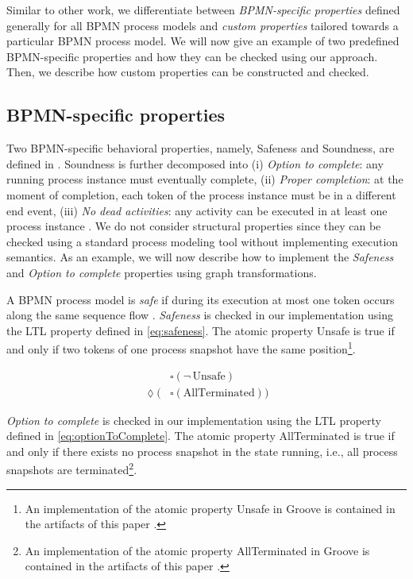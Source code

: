 \documentclass[adraft, copyright, creativecommons]{eptcs} %
\begin{document}
Similar to other work, we differentiate between \emph{BPMN-specific properties} defined generally for all BPMN process models and \emph{custom properties} tailored towards a particular BPMN process model.
We will now give an example of two predefined BPMN-specific properties and how they can be checked using our approach.
Then, we describe how custom properties can be constructed and checked.

\subsection{BPMN-specific properties}
Two BPMN-specific behavioral properties, namely, Safeness and Soundness, are defined in \cite{corradiniClassificationBPMNCollaborations2018}.
Soundness is further decomposed into (i) \emph{Option to complete}: any running process instance must eventually complete, (ii) \emph{Proper completion}: at the moment of completion, each token of the process instance must be in a different end event, (iii) \emph{No dead activities}: any activity can be executed in at least one process instance \cite{corradiniClassificationBPMNCollaborations2018}.
We do not consider structural properties since they can be checked using a standard process modeling tool without implementing execution semantics.
As an example, we will now describe how to implement the \emph{Safeness} and \emph{Option to complete} properties using graph transformations.

A BPMN process model is \emph{safe} if during its execution at most one token occurs along the same sequence flow \cite{corradiniClassificationBPMNCollaborations2018}.
\emph{Safeness} is checked in our implementation using the LTL property defined in \eqref{eq:safeness}.
The atomic property \textsf{Unsafe} is true if and only if two tokens of one process snapshot have the same position\footnote{An implementation of the atomic property \textsf{Unsafe} in Groove is contained in the artifacts of this paper \cite{timkrauterArtifactsTERMGRAPH2022}.}.

\begin{align}
    & \square (\neg \,\text{Unsafe}) \label{eq:safeness} \\
    \lozenge (& \square(\text{AllTerminated})) \label{eq:optionToComplete}
\end{align}

\emph{Option to complete} is checked in our implementation using the LTL property defined in \eqref{eq:optionToComplete}.
The atomic property \textsf{AllTerminated} is true if and only if there exists no process snapshot in the state running, i.e., all process snapshots are terminated\footnote{An implementation of the atomic property \textsf{AllTerminated} in Groove is contained in the artifacts of this paper \cite{timkrauterArtifactsTERMGRAPH2022}.}.
\end{document}
